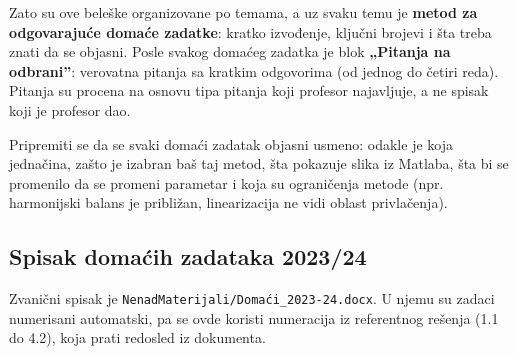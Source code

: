 \documentclass[11pt,a4paper,parskip=half,headsepline,numbers=noenddot]{scrartcl}
\begin{document}
Zato su ove beleške organizovane po temama, a uz svaku temu je \textbf{metod za odgovarajuće domaće zadatke}: kratko izvođenje, ključni brojevi i šta treba znati da se objasni. Posle svakog domaćeg zadatka je blok \textbf{„Pitanja na odbrani''}: verovatna pitanja sa kratkim odgovorima (od jednog do četiri reda). Pitanja su procena na osnovu tipa pitanja koji profesor najavljuje, a ne spisak koji je profesor dao.

\begin{ispit}
Pripremiti se da se svaki domaći zadatak objasni usmeno: odakle je koja jednačina, zašto je izabran baš taj metod, šta pokazuje slika iz Matlaba, šta bi se promenilo da se promeni parametar i koja su ograničenja metode (npr. harmonijski balans je približan, linearizacija ne vidi oblast privlačenja).
\end{ispit}

\subsection{Spisak domaćih zadataka 2023/24}

Zvanični spisak je \texttt{NenadMaterijali/\allowbreak{}Domaći\_\allowbreak{}2023-24.docx}. U njemu su zadaci numerisani automatski, pa se ovde koristi numeracija iz referentnog rešenja (1.1 do 4.2), koja prati redosled iz dokumenta.
\end{document}

